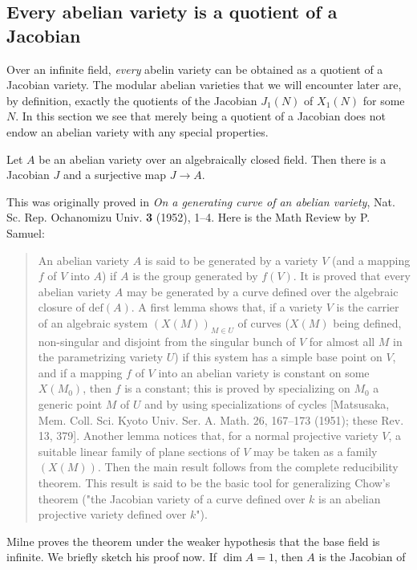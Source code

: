\documentclass{report}
\begin{document}
\subsection{Every abelian variety is a quotient of a Jacobian}
Over an infinite field, {\em every} abelin variety can be obtained
as a quotient of a Jacobian variety.  The modular abelian
varieties that we will encounter later are, by definition, exactly
the quotients of the Jacobian $J_1(N)$ of $X_1(N)$ for some~$N$.
In this section we see that merely being a quotient of a Jacobian
does not endow an abelian variety with any special properties.

\begin{theorem}[Matsusaka]\label{thm:jacvarcover}
Let $A$ be an abelian variety over an algebraically closed field.
Then there is a Jacobian $J$ and a surjective map $J\to A$.
\end{theorem}
This was originally proved in {\em On a generating curve of an
abelian variety}, Nat. Sc. Rep. Ochanomizu Univ. {\bf 3} (1952),
1--4.  Here is the Math Review by P. Samuel:
\begin{quote}
An abelian variety $A$ is said to be generated by a variety $V$
(and a mapping $f$ of $V$ into $A$) if $A$ is the group generated
by $f(V)$. It is proved that every abelian variety $A$ may be
generated by a curve defined over the algebraic closure of
$\text{def}(A)$. A first lemma shows that, if a variety $V$ is the
carrier of an algebraic system $(X(M))_{M\in U}$ of curves ($X(M)$
being defined, non-singular and disjoint from the singular bunch
of $V$ for almost all $M$ in the parametrizing variety $U$) if
this system has a simple base point on $V$, and if a mapping $f$
of $V$ into an abelian variety is constant on some $X(M_0)$, then
$f$ is a constant; this is proved by specializing on $M_0$ a
generic point $M$ of $U$ and by using specializations of cycles
[Matsusaka, Mem. Coll. Sci. Kyoto Univ. Ser. A. Math.  26,
167--173 (1951); these Rev. 13, 379]. Another lemma notices that,
for a normal projective variety $V$, a suitable linear family of
plane sections of $V$ may be taken as a family $(X(M))$. Then the
main result follows from the complete reducibility theorem. This
result is said to be the basic tool for generalizing Chow's
theorem ("the Jacobian variety of a curve defined over $k$ is an
abelian projective variety defined over $k$").
\end{quote}
Milne \cite[\S10]{milne:abvars} proves the theorem under the
weaker hypothesis that the base field is infinite.  We briefly
sketch his proof now. If $\dim A=1$, then $A$ is the Jacobian of
\end{document}
